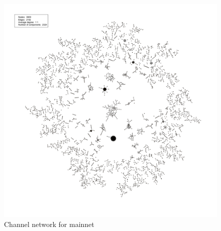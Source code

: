 \begin{figure}[ht]
    \centering
    \includegraphics[width=13cm]{figures/graphs/cg_bc_mainnet_full.png}
    \caption{Channel network for mainnet}
    \label{fig:cg_mainnet_full}
\end{figure}

